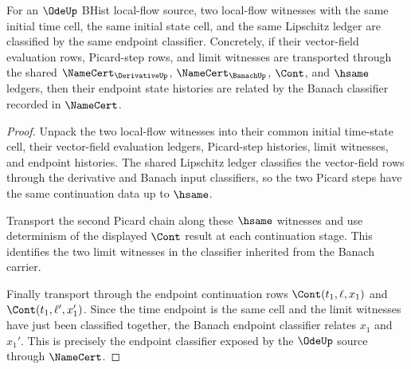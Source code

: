 \begin{theorem}
\label{thm:ode-root-local-uniqueness-classifier}
For an $\OdeUp$ BHist local-flow source, two local-flow witnesses with the same
initial time cell, the same initial state cell, and the same Lipschitz ledger
are classified by the same endpoint classifier. Concretely, if their
vector-field evaluation rows, Picard-step rows, and limit witnesses are
transported through the shared $\NameCert_{\DerivativeUp}$,
$\NameCert_{\BanachUp}$, $\Cont$, and $\hsame$ ledgers, then their endpoint
state histories are related by the Banach classifier recorded in $\NameCert$.
\end{theorem}
\begin{proof}
Unpack the two local-flow witnesses into their common initial time-state cell,
their vector-field evaluation ledgers, Picard-step histories, limit witnesses,
and endpoint histories. The shared Lipschitz ledger classifies the
vector-field rows through the derivative and Banach input classifiers, so the
two Picard steps have the same continuation data up to $\hsame$.

Transport the second Picard chain along these $\hsame$ witnesses and use
determinism of the displayed $\Cont$ result at each continuation stage. This
identifies the two limit witnesses in the classifier inherited from the
Banach carrier.

Finally transport through the endpoint continuation rows
$\Cont(t_1,\ell,x_1)$ and $\Cont(t_1,\ell',x_1')$. Since the time endpoint is
the same cell and the limit witnesses have just been classified together, the
Banach endpoint classifier relates $x_1$ and $x_1'$. This is precisely the
endpoint classifier exposed by the $\OdeUp$ source through $\NameCert$.
\end{proof}

